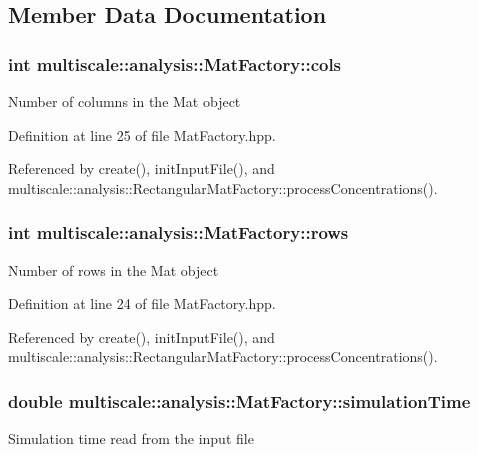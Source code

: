 \subsection{Member Data Documentation}
\hypertarget{classmultiscale_1_1analysis_1_1MatFactory_a9514356fe5226eaa31a4e61ca62a027c}{
\subsubsection[{cols}]{\setlength{\rightskip}{0pt plus 5cm}int multiscale\-::analysis\-::\-Mat\-Factory\-::cols\hspace{0.3cm}{\ttfamily [protected]}}}\label{classmultiscale_1_1analysis_1_1MatFactory_a9514356fe5226eaa31a4e61ca62a027c}
Number of columns in the Mat object 

Definition at line 25 of file Mat\-Factory.\-hpp.



Referenced by create(), init\-Input\-File(), and multiscale\-::analysis\-::\-Rectangular\-Mat\-Factory\-::process\-Concentrations().

\hypertarget{classmultiscale_1_1analysis_1_1MatFactory_a35672fb0c992f662018ee7c146794474}{
\subsubsection[{rows}]{\setlength{\rightskip}{0pt plus 5cm}int multiscale\-::analysis\-::\-Mat\-Factory\-::rows\hspace{0.3cm}{\ttfamily [protected]}}}\label{classmultiscale_1_1analysis_1_1MatFactory_a35672fb0c992f662018ee7c146794474}
Number of rows in the Mat object 

Definition at line 24 of file Mat\-Factory.\-hpp.



Referenced by create(), init\-Input\-File(), and multiscale\-::analysis\-::\-Rectangular\-Mat\-Factory\-::process\-Concentrations().

\hypertarget{classmultiscale_1_1analysis_1_1MatFactory_a99caa620805ac50375699236d83fbd96}{
\subsubsection[{simulation\-Time}]{\setlength{\rightskip}{0pt plus 5cm}double multiscale\-::analysis\-::\-Mat\-Factory\-::simulation\-Time\hspace{0.3cm}{\ttfamily [protected]}}}\label{classmultiscale_1_1analysis_1_1MatFactory_a99caa620805ac50375699236d83fbd96}
Simulation time read from the input file 

